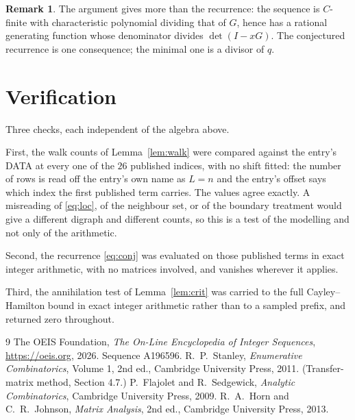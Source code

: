 \documentclass[11pt,a4paper]{article}
\theoremstyle{plain}
\theoremstyle{definition}
\newtheorem{remark}[theorem]{Remark}
\begin{document}
\begin{remark}
The argument gives more than the recurrence: the sequence is $C$-finite with characteristic
polynomial dividing that of $G$, hence has a rational generating function whose denominator
divides $\det(I-xG)$. The conjectured recurrence is one consequence; the minimal one is a
divisor of $q$.
\end{remark}

\section{Verification}

Three checks, each independent of the algebra above.

First, the walk counts of Lemma~\ref{lem:walk} were compared against the entry's DATA at
every one of the $26$ published indices, with no shift fitted: the number of rows is
read off the entry's own name as $L=n$ and the entry's offset says which index the first
published term carries. The values agree exactly. A misreading of \eqref{eq:loc}, of the
neighbour set, or of the boundary treatment would give a different digraph and different
counts, so this is a test of the modelling and not only of the arithmetic.

Second, the recurrence \eqref{eq:conj} was evaluated on those published terms in exact
integer arithmetic, with no matrices involved, and vanishes wherever it applies.

Third, the annihilation test of Lemma~\ref{lem:crit} was carried to the full
Cayley--Hamilton bound in exact integer arithmetic rather than to a sampled prefix, and
returned zero throughout.

\begin{thebibliography}{9}
 The OEIS Foundation, \emph{The On-Line Encyclopedia of Integer
Sequences}, \url{https://oeis.org}, 2026. Sequence A196596.
 R.~P.~Stanley, \emph{Enumerative Combinatorics}, Volume 1, 2nd ed.,
Cambridge University Press, 2011. (Transfer-matrix method, Section 4.7.)
 P.~Flajolet and R.~Sedgewick, \emph{Analytic Combinatorics}, Cambridge
University Press, 2009.
 R.~A.~Horn and C.~R.~Johnson, \emph{Matrix Analysis}, 2nd ed., Cambridge
University Press, 2013.
\end{thebibliography}
\end{document}
